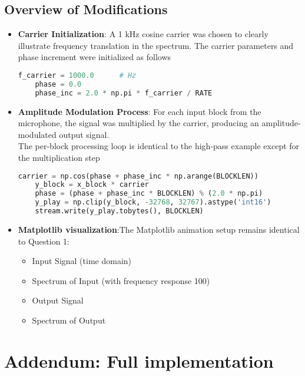\documentclass[11pt]{article}
\begin{document}
\subsection*{Overview of Modifications}
\begin{itemize}
    \item \textbf{Carrier Initialization}: A 1 kHz cosine carrier was chosen to clearly illustrate frequency translation in the spectrum. The carrier parameters and phase increment were initialized as follows
    
    \begin{lstlisting}[language=python, label={lst:code}, breaklines=true]
    f_carrier = 1000.0      # Hz
    phase = 0.0
    phase_inc = 2.0 * np.pi * f_carrier / RATE
    \end{lstlisting}    

    \item \textbf{Amplitude Modulation Process}: For each input block from the microphone, the signal was multiplied by the carrier, producing an amplitude-modulated output signal.
\\The per-block processing loop is identical to the high-pass example except for the multiplication step
    
    \begin{lstlisting}[language=python, label={lst:code}, breaklines=true]
    carrier = np.cos(phase + phase_inc * np.arange(BLOCKLEN))
    y_block = x_block * carrier
    phase = (phase + phase_inc * BLOCKLEN) % (2.0 * np.pi)
    y_play = np.clip(y_block, -32768, 32767).astype('int16')
    stream.write(y_play.tobytes(), BLOCKLEN)
    \end{lstlisting}    
    
    \item \textbf{Matplotlib visualization}:The Matplotlib animation setup remains identical to Question 1:

    \begin{itemize}
        \item Input Signal (time domain)
        \item Spectrum of Input (with frequency response 100)
        \item Output Signal
        \item Spectrum of Output
    \end{itemize}
\end{itemize}
\pagebreak
\section*{Addendum: Full implementation}
\end{document}
